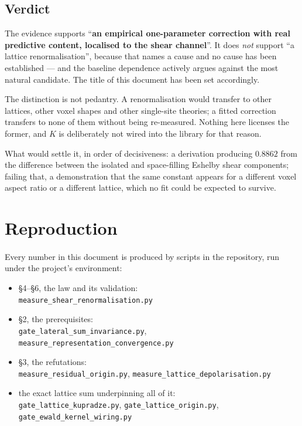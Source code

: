 \documentclass[11pt,a4paper]{article}
\newcommand{\Kren}{K}
\begin{document}
\subsection{Verdict}

\begin{tcolorbox}[colback=gray!6,colframe=black!62,
  title={Where this leaves the claim}]
The evidence supports ``\textbf{an empirical one-parameter correction with real
predictive content, localised to the shear channel}''. It does \emph{not}
support ``a lattice renormalisation'', because that names a cause and no cause
has been established --- and the baseline dependence actively argues against the
most natural candidate. The title of this document has been set accordingly.

The distinction is not pedantry. A renormalisation would transfer to other
lattices, other voxel shapes and other single-site theories; a fitted correction
transfers to none of them without being re-measured. Nothing here licenses the
former, and $\Kren$ is deliberately not wired into the library for that reason.
\end{tcolorbox}

What would settle it, in order of decisiveness: a derivation producing $0.8862$
from the difference between the isolated and space-filling Eshelby shear
components; failing that, a demonstration that the same constant appears for a
different voxel aspect ratio or a different lattice, which no fit could be
expected to survive.

\section{Reproduction}

\paragraph{} Every number in this document is produced by scripts in
the repository, run under the project's environment:

\begin{itemize}[nosep,leftmargin=1.4em]
  \item \S4--\S6, the law and its validation: \\
    \texttt{measure\_shear\_renormalisation.py}
  \item \S2, the prerequisites: \\
    \texttt{gate\_lateral\_sum\_invariance.py},
    \texttt{measure\_representation\_convergence.py}
  \item \S3, the refutations: \\
    \texttt{measure\_residual\_origin.py},
    \texttt{measure\_lattice\_depolarisation.py}
  \item the exact lattice sum underpinning all of it: \\
    \texttt{gate\_lattice\_kupradze.py},
    \texttt{gate\_lattice\_origin.py},
    \texttt{gate\_ewald\_kernel\_wiring.py}
\end{itemize}
\end{document}
